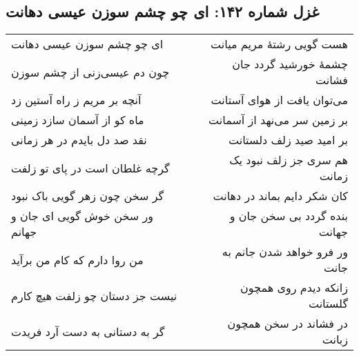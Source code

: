 \begin{center}
\section*{غزل شماره ۱۴۲: ای چو چشم سوزن عیسی دهانت}
\label{sec:142}
\begin{longtable}{l p{0.5cm} r}
ای چو چشم سوزن عیسی دهانت
&&
هست گویی رشتهٔ مریم میانت
\\
چون دم عیسی‌زنی از چشم سوزن
&&
چشمهٔ خورشید گردد جان فشانت
\\
آنچه بر مریم ز راه آستین زد
&&
می‌توان یافت از هوای آستانت
\\
ماه کو از آسمان سازد زمینی
&&
بر زمین سر می‌نهد از آسمانت
\\
نقد صد دل بایدم در هر زمانی
&&
بر امید صید زلف دلستانت
\\
گرچه غلطان است در پای تو زلفت
&&
هم سری جز زلف نبود یک زمانت
\\
گر سخن چون زهر گویی باک نبود
&&
کان شکر دایم بماند در دهانت
\\
ور سخن خوش گویی ای جان و جهانم
&&
بنده گردد بی سخن جان و جهانت
\\
من روا دارم که کام من برآید
&&
ور فرو خواهد شدن جانم به جانت
\\
نیست جز دستان چو زلفت هیچ کارم
&&
زانکه دیدم روی همچون گلستانت
\\
گر به دستانی به دست آرد فریدت
&&
در فشاند در سخن همچون زبانت
\\
\end{longtable}
\end{center}
